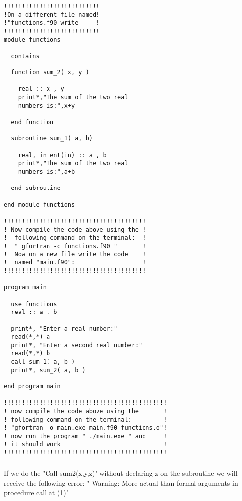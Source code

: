 \documentclass[twocolumn]{article}
\begin{document}
\subsubsection{}
\begin{verbatim}
!!!!!!!!!!!!!!!!!!!!!!!!!!!
!On a different file named!
!"functions.f90 write     !
!!!!!!!!!!!!!!!!!!!!!!!!!!!
module functions

  contains

  function sum_2( x, y )

    real :: x , y
    print*,"The sum of the two real 
    numbers is:",x+y

  end function

  subroutine sum_1( a, b)

    real, intent(in) :: a , b
    print*,"The sum of the two real 
    numbers is:",a+b

  end subroutine 

end module functions

!!!!!!!!!!!!!!!!!!!!!!!!!!!!!!!!!!!!!!!!
! Now compile the code above using the !
!  following command on the terminal:  !
!  " gfortran -c functions.f90 "       !
!  Now on a new file write the code    !
!  named "main.f90":                   !
!!!!!!!!!!!!!!!!!!!!!!!!!!!!!!!!!!!!!!!!

program main

  use functions
  real :: a , b

  print*, "Enter a real number:"
  read(*,*) a
  print*, "Enter a second real number:"
  read(*,*) b
  call sum_1( a, b )
  print*, sum_2( a, b )

end program main

!!!!!!!!!!!!!!!!!!!!!!!!!!!!!!!!!!!!!!!!!!!!!!
! now compile the code above using the       !
! following command on the terminal:         !
! "gfortran -o main.exe main.f90 functions.o"!
! now run the program " ./main.exe " and     !
! it should work                             !
!!!!!!!!!!!!!!!!!!!!!!!!!!!!!!!!!!!!!!!!!!!!!!
\end{verbatim}

\subsubsection{}

\paragraph*{}
If we do the "Call sum2(x,y,z)" without declaring z on the subroutine we will receive the following error:
" Warning: More actual than formal arguments in procedure call at (1)"
\end{document}

